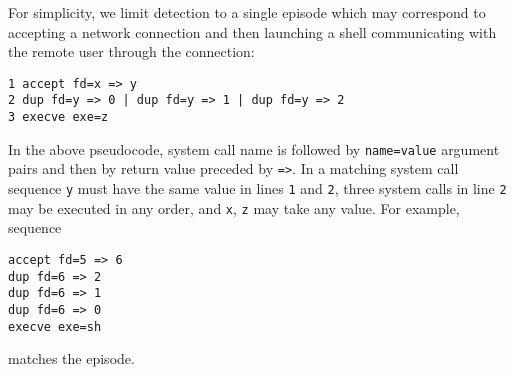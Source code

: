 \documentclass[runningheads,a4paper]{llncs}
\begin{document}
For simplicity, we limit detection to a single episode which may
correspond to accepting a network connection and then launching
a shell communicating with the remote user through the connection:
\begin{verbatim}
1 accept fd=x => y
2 dup fd=y => 0 | dup fd=y => 1 | dup fd=y => 2
3 execve exe=z
\end{verbatim}
In the above pseudocode, system call name is followed by
\texttt{name=value} argument pairs and then by return value
preceded by \texttt{=>}.  In a matching system call sequence
\texttt{y} must have the same value in lines \texttt{1} and
\texttt{2}, three system calls in line \texttt{2} may be
executed in any order, and \texttt{x}, \texttt{z} may take any
value.  For example, sequence
\begin{verbatim}
accept fd=5 => 6
dup fd=6 => 2
dup fd=6 => 1
dup fd=6 => 0
execve exe=sh
\end{verbatim}
matches the episode.
\end{document}
